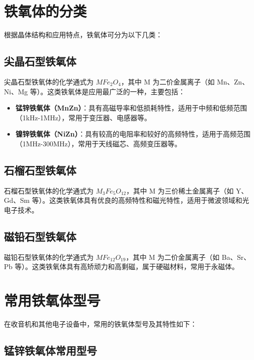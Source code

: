 \documentclass[12pt,UTF8]{ctexbook}
\begin{document}
\section{铁氧体的分类}

根据晶体结构和应用特点，铁氧体可分为以下几类：

\subsection{尖晶石型铁氧体}

尖晶石型铁氧体的化学通式为 $MFe_2O_4$，其中 M 为二价金属离子（如 Mn、Zn、Ni、Mg 等）。这类铁氧体是应用最广泛的一种，主要包括：

\begin{itemize}[leftmargin=2cm]
    \item \textbf{锰锌铁氧体（MnZn）}：具有高磁导率和低损耗特性，适用于中频和低频范围（1kHz-1MHz），常用于变压器、电感器等。
    \item \textbf{镍锌铁氧体（NiZn）}：具有较高的电阻率和较好的高频特性，适用于高频范围（1MHz-300MHz），常用于天线磁芯、高频变压器等。
\end{itemize}

\subsection{石榴石型铁氧体}

石榴石型铁氧体的化学通式为 $M_3Fe_5O_{12}$，其中 M 为三价稀土金属离子（如 Y、Gd、Sm 等）。这类铁氧体具有优良的高频特性和磁光特性，适用于微波领域和光电子技术。

\subsection{磁铅石型铁氧体}

磁铅石型铁氧体的化学通式为 $MFe_{12}O_{19}$，其中 M 为二价金属离子（如 Ba、Sr、Pb 等）。这类铁氧体具有高矫顽力和高剩磁，属于硬磁材料，常用于永磁体。

\section{常用铁氧体型号}

在收音机和其他电子设备中，常用的铁氧体型号及其特性如下：

\subsection{锰锌铁氧体常用型号}
\end{document}
